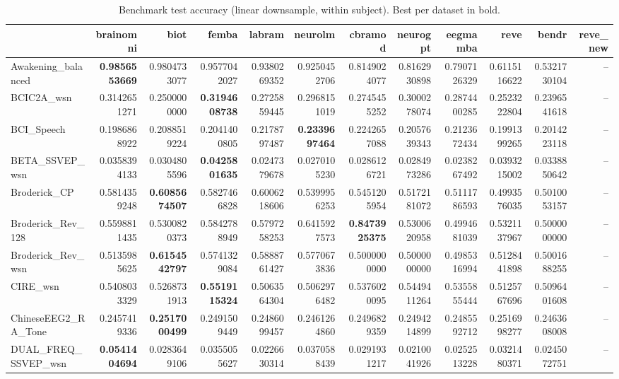 \begin{table}[htbp]
\caption{Benchmark test accuracy (linear downsample, within subject). Best per dataset in bold.}
\label{tab:benchmark_results_linear_downsample_within_subject}
\begin{tabular}{lrrrrrrrrrrr}
\toprule
 & brainomni & biot & femba & labram & neurolm & cbramod & neurogpt & eegmamba & reve & bendr & reve_new \\
\midrule
Awakening_balanced & \bfseries 0.9856553669 & 0.9804733077 & 0.9577042027 & 0.9380269352 & 0.9250452706 & 0.8149024077 & 0.8162930898 & 0.7907126329 & 0.6115116622 & 0.5321730104 & -- \\
BCIC2A_wsn & 0.3142651271 & 0.2500000000 & \bfseries 0.3194608738 & 0.2725859445 & 0.2968151019 & 0.2745455252 & 0.3000278074 & 0.2874400285 & 0.2523222804 & 0.2396541618 & -- \\
BCI_Speech & 0.1986868922 & 0.2088519224 & 0.2041400805 & 0.2178797487 & \bfseries 0.2339697464 & 0.2242657088 & 0.2057639343 & 0.2123672434 & 0.1991399265 & 0.2014223118 & -- \\
BETA_SSVEP_wsn & 0.0358394133 & 0.0304805596 & \bfseries 0.0425801635 & 0.0247379678 & 0.0270105230 & 0.0286126721 & 0.0284973286 & 0.0238267492 & 0.0393215002 & 0.0338850642 & -- \\
Broderick_CP & 0.5814359248 & \bfseries 0.6085674507 & 0.5827466828 & 0.6006218606 & 0.5399956253 & 0.5451205954 & 0.5172181072 & 0.5111786593 & 0.4993576035 & 0.5010053157 & -- \\
Broderick_Rev_128 & 0.5598811435 & 0.5300820373 & 0.5842788949 & 0.5797258253 & 0.6415927573 & \bfseries 0.8473925375 & 0.5300620958 & 0.4994681039 & 0.5321137967 & 0.5000000000 & -- \\
Broderick_Rev_wsn & 0.5135985625 & \bfseries 0.6154542797 & 0.5741329084 & 0.5888761427 & 0.5770673836 & 0.5000000000 & 0.5000000000 & 0.4985316994 & 0.5128441898 & 0.5001688255 & -- \\
CIRE_wsn & 0.5408033329 & 0.5268731913 & \bfseries 0.5519115324 & 0.5063564304 & 0.5062976482 & 0.5376020095 & 0.5449411264 & 0.5355855444 & 0.5125767696 & 0.5096401608 & -- \\
ChineseEEG2_RA_Tone & 0.2457419336 & \bfseries 0.2517000499 & 0.2491509449 & 0.2486099457 & 0.2461264860 & 0.2496829359 & 0.2494214899 & 0.2485592712 & 0.2516998277 & 0.2463608008 & -- \\
DUAL_FREQ_SSVEP_wsn & \bfseries 0.0541404694 & 0.0283649106 & 0.0355055627 & 0.0226630314 & 0.0370588439 & 0.0291931217 & 0.0210041926 & 0.0252513228 & 0.0321480371 & 0.0245072751 & -- \\

\end{tabular}
\end{table}
